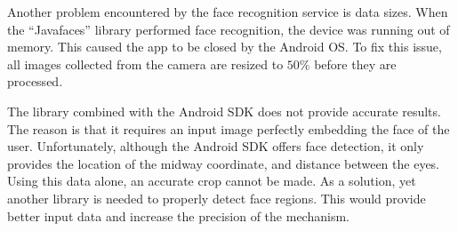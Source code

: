 Another problem encountered by the face recognition service is data sizes. When the ``Javafaces'' library performed face recognition, the device was running out of memory. This caused the app to be closed by the Android OS. To fix this issue, all images collected from the camera are resized to $50\%$ before they are processed.

The library combined with the Android SDK does not provide accurate results. The reason is that it requires an input image perfectly embedding the face of the user. Unfortunately, although the Android SDK offers face detection, it only provides the location of the midway coordinate, and distance between the eyes. Using this data alone, an accurate crop cannot be made. As a solution, yet another library is needed to properly detect face regions. This would provide better input data and increase the precision of the mechanism.

